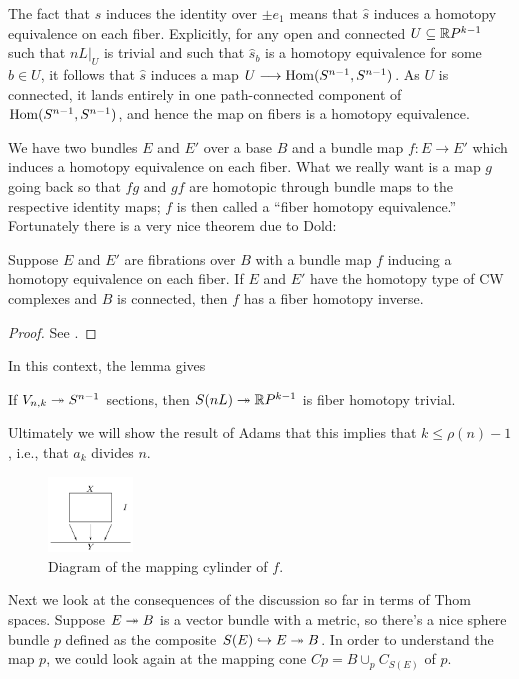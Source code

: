 The fact that $\hat s$ induces the identity over $\pm e_1$ means that $\hat s$ induces a homotopy equivalence on each fiber.  Explicitly, for any open and connected $U \subseteq \mathbb{R} P^{k-1}$ such that $nL|_U$ is trivial and such that $\hat s_b$ is a homotopy equivalence for some $b \in U$, it follows that $\hat s$ induces a map $U \longrightarrow \operatorname{Hom}(S^{n-1}, S^{n-1})$.  As $U$ is connected, it lands entirely in one path-connected component of $\operatorname{Hom}(S^{n-1}, S^{n-1})$, and hence the map on fibers is a homotopy equivalence.

We have two bundles $E$ and $E'$ over a base $B$ and a bundle map $f: E \to E'$ which induces a homotopy equivalence on each fiber.  What we really want is a map $g$ going back so that $fg$ and $gf$ are homotopic through bundle maps to the respective identity maps;  $f$ is then called a ``fiber homotopy equivalence.''  Fortunately there is a very nice theorem due to Dold:
\begin{thm}[Dold]\label{LemmaOfDold}
Suppose $E$ and $E'$ are fibrations over $B$ with a bundle map $f$ inducing a homotopy equivalence on each fiber.  If $E$ and $E'$ have the homotopy type of CW complexes and $B$ is connected, then $f$ has a fiber homotopy inverse.
\end{thm}
\begin{proof}
See \cite{James}.
\end{proof}
In this context, the lemma gives
\begin{cor}
If $V_{n, k} \twoheadrightarrow S^{n-1}$ sections, then $S(nL) \twoheadrightarrow \mathbb{R} P^{k-1}$ is fiber homotopy trivial.
\end{cor}
Ultimately we will show the result of Adams that this implies that $k \le \rho(n) - 1$, i.e., that $a_k$ divides $n$.


\begin{figure}
\centering\includegraphics[width=0.2\textwidth]{figures/fig7.pdf}
\caption{\small Diagram of the mapping cylinder of $f$.}
\end{figure} %
Next we look at the consequences of the discussion so far in terms of Thom spaces.  Suppose $E \twoheadrightarrow B$ is a vector bundle with a metric, so there's a nice sphere bundle $p$ defined as the composite $S(E) \hookrightarrow E \twoheadrightarrow B$.  In order to understand the map $p$, we could look again at the mapping cone $Cp = B \cup_p C_{S(E)}$ of $p$.  

